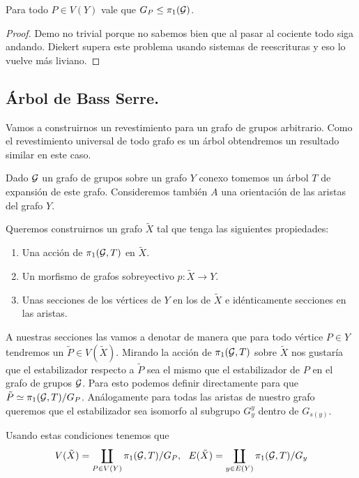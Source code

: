 \documentclass[tesis.tex]{subfiles}
\newcommand{\cG}{ {\cal G} }
\begin{document}

\begin{teo}
	Para todo $P \in V(Y)$ vale que $G_P \le \pi_1(\cG)$. 
\end{teo}
\begin{proof}
	Demo no trivial porque no sabemos bien que al pasar al cociente todo siga andando. 
	Diekert supera este problema usando sistemas de reescrituras y eso lo vuelve más liviano.
\end{proof}

\subsection{Árbol de Bass Serre.}

Vamos a construirnos un revestimiento para un grafo de grupos arbitrario. 
Como el revestimiento universal de todo grafo es un árbol obtendremos un resultado similar en este caso.

Dado $\cG$ un grafo de grupos sobre un grafo $Y$ conexo tomemos un árbol $T$ de expansión de este grafo.
Consideremos también $A$ una orientación de las aristas del grafo $Y$.

Queremos construirnos un grafo $\tilde X$ tal que tenga las siguientes propiedades:

\begin{enumerate}
	\item Una acción de $\pi_1(\cG, T)$ en $\tilde X$.
	\item Un morfismo de grafos sobreyectivo $p:\tilde X \to Y$. 
	\item Unas secciones de los vértices de $Y$ en los de $\tilde X$ e idénticamente secciones en las aristas.
\end{enumerate}

A nuestras secciones las vamos a denotar de manera que para todo vértice $P \in Y$ tendremos un $ \tilde P \in V(\tilde X)$.
Mirando la acción de $\pi_1(\cG, T)$ sobre $\tilde X$ nos gustaría que el estabilizador respecto a $\tilde P$ sea el mismo que el estabilizador de $P$ en el grafo de grupos $\cG$. 
Para esto podemos definir directamente para que $\tilde P \simeq \pi_1(\cG, T) / G_P$.
Análogamente para todas las aristas de nuestro grafo queremos que el estabilizador sea isomorfo al subgrupo $G^y_y$ dentro de $G_{s(y)}$.

Usando estas condiciones tenemos que
\begin{equation*}
	V(\tilde X) = \coprod_{P \in V(Y)} \pi_1(\cG, T) / G_P, \ \  E(\tilde X) = \coprod_{y \in E(Y)} \pi_1(\cG, T) / G_y
\end{equation*}
\end{document}
